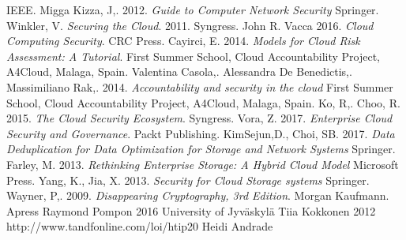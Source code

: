 \documentclass{article}
\begin{document}
\begin{thebibliography}{9}
        IEEE.
        Migga Kizza, J,.
        2012.
        \textit{Guide to Computer Network Security}
	Springer.
        Winkler, V.
	\textit{Securing the Cloud}.
        2011.
        Syngress.
        John R. Vacca
        2016.
        \textit{Cloud Computing Security}.
	CRC Press.
        Cayirci, E.
	2014.
        \textit{Models for Cloud Risk Assessment: A Tutorial}.
        First Summer School, Cloud Accountability Project, A4Cloud, Malaga, Spain.
        Valentina Casola,.
        Alessandra De Benedictis,.
        Massimiliano Rak,.
        2014.
	\textit{Accountability and security in the cloud}
       	First Summer School, Cloud Accountability Project, A4Cloud, Malaga, Spain. 
        Ko, R,. 
	Choo, R.
        2015.
        \textit{The Cloud Security Ecosystem}.
	Syngress.
        Vora, Z.
        2017.
	\textit{Enterprise Cloud Security and Governance}.
	Packt Publishing.
        KimSejun,D.,
        Choi, SB.
        2017.
	\textit{Data Deduplication for Data Optimization for Storage and Network Systems}
        Springer.
        Farley, M.
        2013.
	\textit{Rethinking Enterprise Storage: A Hybrid Cloud Model}
        Microsoft Press.
        Yang, K.,
	Jia, X.
        2013.
	\textit{Security for Cloud Storage systems}
        Springer.
        Wayner, P,.
        2009.
	\textit{Disappearing Cryptography, 3rd Edition}.
        Morgan Kaufmann.
        Apress
        Raymond Pompon
        2016
        University of Jyväskylä
        Tiia Kokkonen
        2012
        http://www.tandfonline.com/loi/htip20
        Heidi Andrade

\end{thebibliography}
\end{document}

